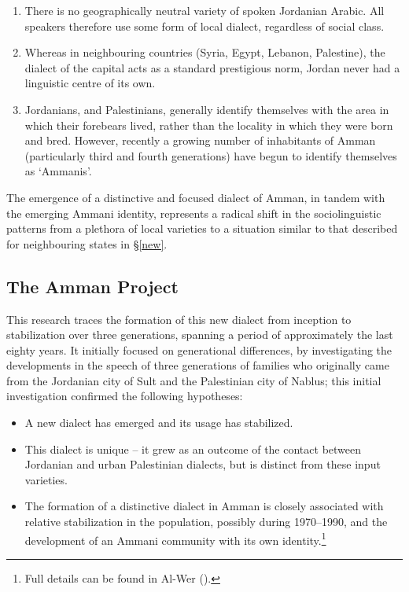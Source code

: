 \documentclass[output=paper]{langsci/langscibook}
\begin{document}
\begin{enumerate}
\item 
There is no geographically neutral variety of spoken Jordanian Arabic. All speakers therefore use some form of local dialect, regardless of social class.

\item 
Whereas in neighbouring countries (Syria, Egypt, Lebanon, Palestine), the dialect of the capital acts as a standard prestigious norm, Jordan never had a linguistic centre of its own.

\item 
Jordanians, and Palestinians, generally identify themselves with the area in which their forebears lived, rather than the locality in which they were born and bred. However, recently a growing number of inhabitants of Amman (particularly third and fourth generations) have begun to identify themselves as ‘Ammanis’.

\end{enumerate}

The emergence of a distinctive and focused dialect of Amman, in tandem with the emerging Ammani identity, represents a radical shift in the sociolinguistic patterns from a plethora of local varieties to a situation similar to that described for neighbouring states in §\ref{new}.

\subsection{The Amman Project}

This research traces the formation of this new dialect from inception to stabilization over three generations, spanning a period of approximately the last eighty years. It initially focused on generational differences, by investigating the developments in the speech of three generations of families who originally came from the Jordanian city of Sult and the Palestinian city of Nablus; this initial investigation confirmed the following hypotheses:

\begin{itemize}
\item[] 
A new dialect has emerged and its usage has stabilized.

\item[]
This dialect is unique -- it grew as an outcome of the contact between Jordanian and urban Palestinian dialects, but is distinct from these input varieties.

\item[] 
The formation of a distinctive dialect in Amman is closely associated with relative stabilization in the population, possibly during 1970–1990, and the development of an Ammani community with its own identity.\footnote{Full details can be found in Al-Wer (\citeyear{Al-Wer2002,Al-Wer2003kum}).}

\end{itemize}
\end{document}
